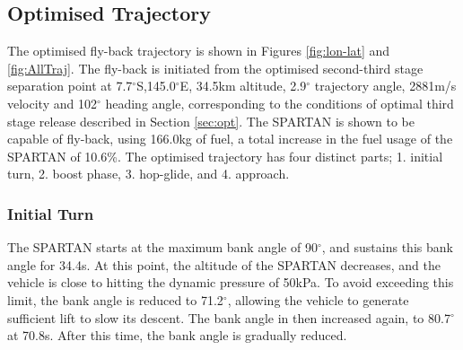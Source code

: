 \subsection{Optimised Trajectory}




The optimised fly-back trajectory is shown in Figures \ref{fig:lon-lat} and \ref{fig:AllTraj}.
The fly-back is initiated from the optimised second-third stage separation point at 7.7$^\circ$S,145.0$^\circ$E, 34.5km altitude, 2.9$^\circ$ trajectory angle, 2881m/s velocity and 102$^\circ$ heading angle, corresponding to the conditions of optimal third stage release described in Section \ref*{sec:opt}. 
The SPARTAN is shown to be capable of fly-back, using 166.0kg of fuel, a total increase in the fuel usage of the SPARTAN of 10.6\%.
The optimised trajectory has four distinct parts; 1. initial turn, 2. boost phase, 3. hop-glide, and 4. approach. 

\subsubsection{ Initial Turn}
The SPARTAN starts at the maximum bank angle of 90$^\circ$, and sustains this bank angle for 34.4s. At this point, the altitude of the SPARTAN decreases, and the vehicle is close to hitting the dynamic pressure of 50kPa. To avoid exceeding this limit, the bank angle is reduced to 71.2$^\circ$, allowing the vehicle to generate sufficient lift to slow its descent. The bank angle in then increased again, to 80.7$^\circ$ at 70.8s. After this time, the bank angle is gradually reduced. 

